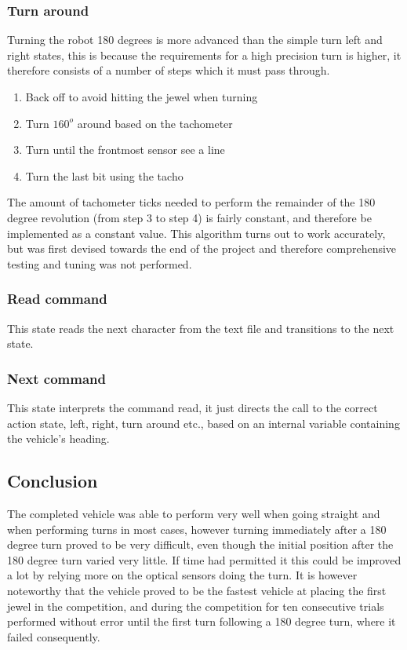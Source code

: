 \documentclass[final, english, a4paper]{article}
\begin{document}
	    \subsubsection{Turn around}
	        Turning the robot 180 degrees is more advanced than the simple turn left and right
	        states, this is because the requirements for a high precision turn is
	        higher, it therefore consists of a number of steps which it must pass
	        through.
	        \begin{enumerate}
	            \item Back off to avoid hitting the jewel when turning
	            \item Turn $160^o$ around based on the tachometer
	            \item Turn until the frontmost sensor see a line
	            \item Turn the last bit using the tacho
	        \end{enumerate}
	        The amount of tachometer ticks needed to perform the remainder of the 180 degree revolution (from step 3 to step 4) is fairly constant, and therefore be implemented as a constant value.
	        This algorithm turns out to work accurately, but was first devised
	         towards the end of the project
	        and therefore comprehensive testing and tuning was not performed.
	    \subsubsection{Read command}
	        This state reads the next character from the text file and 
	        transitions to the next state.
	    \subsubsection{Next command}
	        This state interprets the command read, it just directs the call
	        to the correct action state, left, right, turn around etc., based on 
	        an internal variable containing the vehicle's heading. 

	\subsection{Conclusion} %
	    \label{robot:conclusion}
	   The completed vehicle was able to perform very well when going straight
	   and when performing turns in most cases, however turning immediately after a
	   180 degree turn proved to be very difficult, even though
	   the initial position after the 180 degree turn varied very little.
       If time had permitted it this could be 
	   improved a lot by relying more on the optical sensors doing the turn.
	   It is however noteworthy that the vehicle proved to be the fastest vehicle
	   at placing the first jewel in the competition, and during the competition for ten consecutive trials
	   performed without error until the first turn following a 180 degree turn, where it failed consequently.
\end{document}

